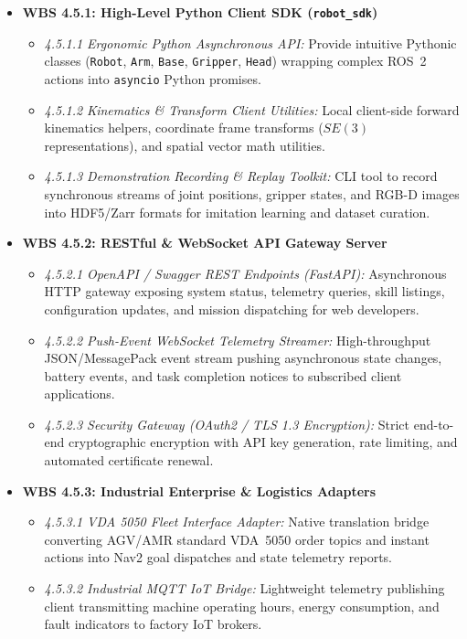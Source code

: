 \documentclass[10pt,a4paper]{article}
\begin{document}
\begin{itemize}[leftmargin=1.5em]
    \item \textbf{WBS 4.5.1: High-Level Python Client SDK (\texttt{robot\_sdk})}
    \begin{itemize}[leftmargin=1.2em]
        \item \emph{4.5.1.1 Ergonomic Python Asynchronous API:} Provide intuitive Pythonic classes (\texttt{Robot}, \texttt{Arm}, \texttt{Base}, \texttt{Gripper}, \texttt{Head}) wrapping complex ROS~2 actions into \texttt{asyncio} Python promises.
        \item \emph{4.5.1.2 Kinematics \& Transform Client Utilities:} Local client-side forward kinematics helpers, coordinate frame transforms ($SE(3)$ representations), and spatial vector math utilities.
        \item \emph{4.5.1.3 Demonstration Recording \& Replay Toolkit:} CLI tool to record synchronous streams of joint positions, gripper states, and RGB-D images into HDF5/Zarr formats for imitation learning and dataset curation.
    \end{itemize}

    \item \textbf{WBS 4.5.2: RESTful \& WebSocket API Gateway Server}
    \begin{itemize}[leftmargin=1.2em]
        \item \emph{4.5.2.1 OpenAPI / Swagger REST Endpoints (FastAPI):} Asynchronous HTTP gateway exposing system status, telemetry queries, skill listings, configuration updates, and mission dispatching for web developers.
        \item \emph{4.5.2.2 Push-Event WebSocket Telemetry Streamer:} High-throughput JSON/MessagePack event stream pushing asynchronous state changes, battery events, and task completion notices to subscribed client applications.
        \item \emph{4.5.2.3 Security Gateway (OAuth2 / TLS 1.3 Encryption):} Strict end-to-end cryptographic encryption with API key generation, rate limiting, and automated certificate renewal.
    \end{itemize}

    \item \textbf{WBS 4.5.3: Industrial Enterprise \& Logistics Adapters}
    \begin{itemize}[leftmargin=1.2em]
        \item \emph{4.5.3.1 VDA 5050 Fleet Interface Adapter:} Native translation bridge converting AGV/AMR standard VDA~5050 order topics and instant actions into Nav2 goal dispatches and state telemetry reports.
        \item \emph{4.5.3.2 Industrial MQTT IoT Bridge:} Lightweight telemetry publishing client transmitting machine operating hours, energy consumption, and fault indicators to factory IoT brokers.
    \end{itemize}
\end{itemize}
\end{document}
